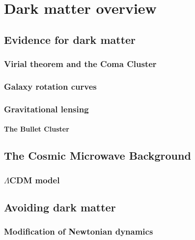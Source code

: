 \chapter{Dark matter overview}\label{chap:DarkMatterOverview}
\section{Evidence for dark matter}\label{sec:DMOverview/Evidence4DM}

\subsection{Virial theorem and the Coma Cluster}\label{sec:DMOverview/ViralTheorem}

\subsection{Galaxy rotation curves}\label{sec:DMOverview/RotationCurves}

\subsection{Gravitational lensing}\label{sec:DMOverview/GravLens}

\subsubsection{The Bullet Cluster}\label{sec:DMOverview/BulletCluster}

\section{The Cosmic Microwave Background}\label{sec:DMOverview/CMB}

\subsection{$\Lambda$CDM model}\label{sec:DMOverview/LambdaCDM}

\section{Avoiding dark matter}\label{sec:DMOverview/AvoidDM}

\subsection{Modification of Newtonian dynamics}\label{sec:DMOverview/MOND}

